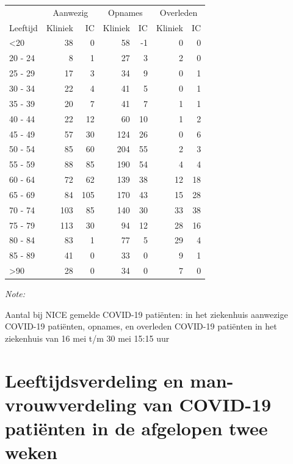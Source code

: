 \documentclass[
  english,
  man,floatsintext]{apa6}
\begin{document}
\begin{table}
\centering\begingroup\fontsize{10}{12}\selectfont

\begin{threeparttable}
\begin{tabular}{lrrrrrr}
\toprule
\multicolumn{1}{c}{ } & \multicolumn{2}{c}{Aanwezig} & \multicolumn{2}{c}{Opnames} & \multicolumn{2}{c}{Overleden} \\
\cmidrule(l{3pt}r{3pt}){2-3} \cmidrule(l{3pt}r{3pt}){4-5} \cmidrule(l{3pt}r{3pt}){6-7}
Leeftijd & Kliniek & IC & Kliniek & IC & Kliniek & IC\\
\midrule
<20 & 38 & 0 & 58 & -1 & 0 & 0\\
20 - 24 & 8 & 1 & 27 & 3 & 2 & 0\\
25 - 29 & 17 & 3 & 34 & 9 & 0 & 1\\
30 - 34 & 22 & 4 & 41 & 5 & 0 & 1\\
35 - 39 & 20 & 7 & 41 & 7 & 1 & 1\\
40 - 44 & 22 & 12 & 60 & 10 & 1 & 2\\
45 - 49 & 57 & 30 & 124 & 26 & 0 & 6\\
50 - 54 & 85 & 60 & 204 & 55 & 2 & 3\\
55 - 59 & 88 & 85 & 190 & 54 & 4 & 4\\
60 - 64 & 72 & 62 & 139 & 38 & 12 & 18\\
65 - 69 & 84 & 105 & 170 & 43 & 15 & 28\\
70 - 74 & 103 & 85 & 140 & 30 & 33 & 38\\
75 - 79 & 113 & 30 & 94 & 12 & 28 & 16\\
80 - 84 & 83 & 1 & 77 & 5 & 29 & 4\\
85 - 89 & 41 & 0 & 33 & 0 & 9 & 1\\
>90 & 28 & 0 & 34 & 0 & 7 & 0\\
\bottomrule
\end{tabular}
\begin{tablenotes}
\item \textit{Note: } 
\item Aantal bij NICE gemelde COVID-19 patiënten: in het ziekenhuis aanwezige COVID-19 patiënten, opnames, en overleden COVID-19 patiënten in het ziekenhuis van 16 mei t/m 30 mei 15:15 uur
\end{tablenotes}
\end{threeparttable}
\endgroup{}
\end{table}

\newpage

\hypertarget{leeftijdsverdeling-en-man-vrouwverdeling-van-covid-19-patiuxebnten-in-de-afgelopen-twee-weken}{%
\section{Leeftijdsverdeling en man-vrouwverdeling van COVID-19 patiënten in de afgelopen twee weken}\label{leeftijdsverdeling-en-man-vrouwverdeling-van-covid-19-patiuxebnten-in-de-afgelopen-twee-weken}}
\end{document}
